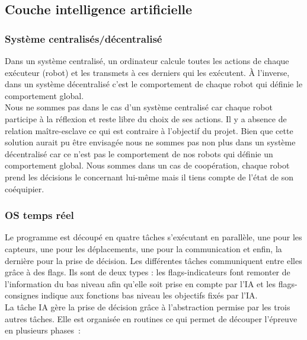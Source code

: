 \documentclass{article}
\begin{document}
\subsection{Couche intelligence artificielle}

\subsubsection{Système centralisés/décentralisé}

Dans un système centralisé, un ordinateur calcule toutes les actions de chaque exécuteur (robot) et les transmets à ces derniers qui les exécutent. À l'inverse, dans un système décentralisé c'est le comportement de chaque robot qui définie le comportement global. \\

Nous ne sommes pas dans le cas d'un système centralisé car chaque robot participe à la réflexion et reste libre du choix de ses actions. Il y a absence de relation maître-esclave ce qui est contraire à l'objectif du projet. Bien que cette solution aurait pu être envisagée nous ne sommes pas non plus dans un système décentralisé car ce n'est pas le comportement de nos robots qui définie un comportement global. Nous sommes dans un cas de coopération, chaque robot prend les décisions le concernant lui-même mais il tiens compte de l'état de son coéquipier. \\

\subsubsection{OS temps réel}
Le programme est découpé en quatre tâches s’exécutant en parallèle, une pour les capteurs, une pour les déplacements, une pour la communication et enfin, la dernière pour la prise de décision. Les différentes tâches communiquent entre elles grâce à des flags. Ils sont de deux types : les flags-indicateurs font remonter de l'information du bas niveau afin qu'elle soit prise en compte par l'IA et les flags-consignes indique aux fonctions bas niveau les objectifs fixés par l'IA. \\

La tâche IA gère la prise de décision grâce à l'abstraction permise par les trois autres tâches. Elle est organisée en routines ce qui permet de découper l'épreuve en plusieurs phases~: \\
\end{document}
